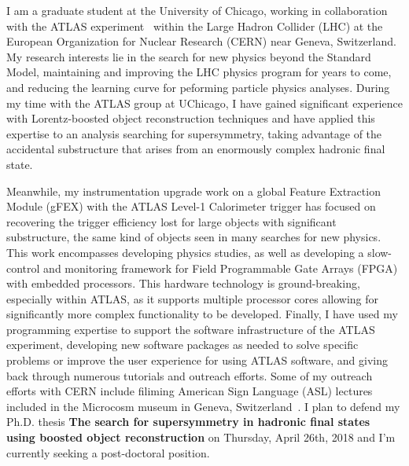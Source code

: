 \documentclass[letterpaper, 10pt]{article}
\begin{document}
\pagestyle{fancy}

I am a graduate student at the University of Chicago, working in collaboration with the ATLAS experiment~ within the Large Hadron Collider (LHC) at the European Organization for Nuclear Research (CERN) near Geneva, Switzerland. My research interests lie in the search for new physics beyond the Standard Model, maintaining and improving the LHC physics program for years to come, and reducing the learning curve for peforming particle physics analyses. During my time with the ATLAS group at UChicago, I have gained significant experience with Lorentz-boosted object reconstruction techniques and have applied this expertise to an analysis searching for supersymmetry, taking advantage of the accidental substructure that arises from an enormously complex hadronic final state.

Meanwhile, my instrumentation upgrade work on a global Feature Extraction Module (gFEX) with the ATLAS Level-1 Calorimeter trigger has focused on recovering the trigger efficiency lost for large objects with significant substructure, the same kind of objects seen in many searches for new physics. This work encompasses developing physics studies, as well as developing a slow-control and monitoring framework for Field Programmable Gate Arrays (FPGA) with embedded processors. This hardware technology is ground-breaking, especially within ATLAS, as it supports multiple processor cores allowing for significantly more complex functionality to be developed. Finally, I have used my programming expertise to support the software infrastructure of the ATLAS experiment, developing new software packages as needed to solve specific problems or improve the user experience for using ATLAS software, and giving back through numerous tutorials and outreach efforts. Some of my outreach efforts with CERN include filiming American Sign Language (ASL) lectures included in the Microcosm museum in Geneva, Switzerland~. I plan to defend my Ph.D. thesis \textbf{The search for supersymmetry in hadronic final states using boosted object reconstruction} on Thursday, April 26th, 2018 and I'm currently seeking a post-doctoral position.

\end{document}
